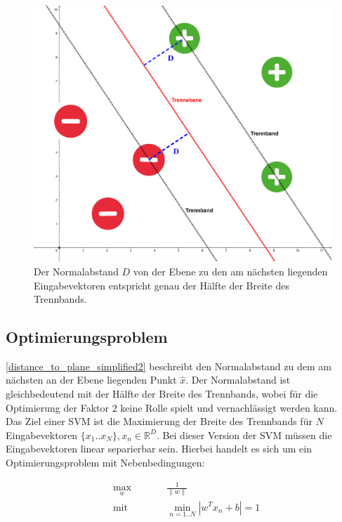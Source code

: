 \documentclass[a4paper,11pt,twoside]{scrreprt}
\newcommand{\norm}[1]{\lVert#1\rVert}
\begin{document}
\begin{figure}[H]
	\centering
	\includegraphics[width = 13cm]{assets/trennband_mit_D.png}
	\caption{Der Normalabstand $D$ von der Ebene zu den am nächsten liegenden Eingabevektoren entspricht genau der Hälfte der Breite des Trennbands.}
	\label{fig:trennband2}
\end{figure}


\subsection{Optimierungsproblem}

\autoref{distance_to_plane_simplified2} beschreibt den Normalabstand zu dem am nächsten an der Ebene liegenden Punkt $\hat{x}$. Der Normalabstand ist gleichbedeutend mit der Hälfte der Breite des Trennbands, wobei für die Optimierung der Faktor $2$ keine Rolle spielt und vernachlässigt werden kann. \\
Das Ziel einer \ac{SVM} ist die Maximierung der Breite des Trennbands für $N$ Eingabevektoren $\{x_{1}..x_{N}\}, x_{n} \in \mathbb{R}^{D}$. Bei dieser Version der \ac{SVM} müssen die Eingabevektoren linear separierbar sein. Hierbei handelt es sich um ein Optimierungsproblem mit Nebenbedingungen:

\begin{subequations}
	\begin{alignat}{2}
		&\!\max_{w}        &\qquad&  \frac{1}{\norm{w}} \label{eq:optProb}\\
		&\text{mit } &      & \min_{n=1..N} |w^{T} x_{n} + b| = 1 \label{eq:constraint1}
	\end{alignat}
\end{subequations}
\end{document}
